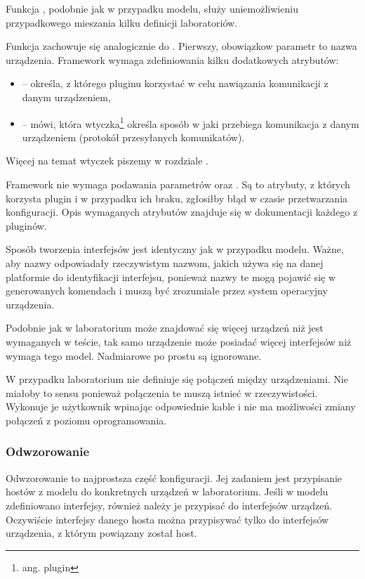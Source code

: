 \documentclass[00-praca-magisterska.tex]{subfiles}
\begin{document}
Funkcja , podobnie jak w przypadku modelu, służy
uniemożliwieniu przypadkowego mieszania kilku definicji laboratoriów.

Funkcja  zachowuje się analogicznie do .
Pierwszy, obowiązkow parametr to nazwa urządzenia. Framework wymaga
zdefiniowania kilku dodatkowych atrybutów:
\begin{itemize}
\item {} -- określa, z którego pluginu korzystać w celu
nawiązania komunikacji z danym urządzeniem,
\item {} -- mówi, która wtyczka\footnote{ang. plugin} określa
sposób w jaki przebiega komunikacja z danym urządzeniem (protokół przesyłanych
komunikatów).
\end{itemize}


Więcej na temat wtyczek piszemy w rozdziale .

Framework nie wymaga podawania parametrów  oraz . Są to
atrybuty, z których korzysta plugin  i w przypadku ich braku,
zgłosiłby błąd w czasie przetwarzania konfiguracji. Opis wymaganych atrybutów
znajduje się w dokumentacji każdego z pluginów.

Sposób tworzenia interfejsów jest identyczny jak w przypadku modelu. Ważne, aby
nazwy odpowiadały rzeczywistym nazwom, jakich używa się na danej platformie do
identyfikacji interfejsu, ponieważ nazwy te mogą pojawić się w generowanych
komendach i muszą być zrozumiałe przez system operacyjny urządzenia.

Podobnie jak w laboratorium może znajdować się więcej urządzeń niż jest
wymaganych w teście, tak samo urządzenie może posiadać więcej interfejsów niż
wymaga tego model. Nadmiarowe po prostu są ignorowane.

W przypadku laboratorium nie definiuje się połączeń między urządzeniami. Nie
miałoby to sensu ponieważ połączenia te muszą istnieć w rzeczywistości.
Wykonuje je użytkownik wpinając odpowiednie kable i nie ma możliwości zmiany
połączeń z poziomu oprogramowania.

\subsubsection{Odwzorowanie}

Odwzorowanie to najprostsza część konfiguracji. Jej zadaniem jest przypisanie
hostów z modelu do konkretnych urządzeń w laboratorium. Jeśli w modelu
zdefiniowano interfejsy, również należy je przypisać do interfejsów urządzeń.
Oczywiście interfejsy danego hosta można przypisywać tylko do interfejsów
urządzenia, z którym powiązany został host.
\end{document}
